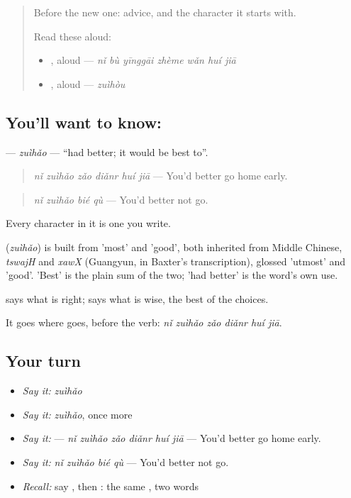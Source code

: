 \label{lesson:ZH-C282-zuihao}



\begin{quote}
Before the new one: advice, and the character it starts with.

Read these aloud:

\begin{itemize}
\raggedright
  \item {}, aloud — \emph{nǐ bù yīnggāi zhème wǎn huí jiā}
  \item {}, aloud — \emph{zuìhòu}
\end{itemize}
\end{quote}

\subsection*{You'll want to know: }
\textbf{} — \emph{zuìhǎo} — \textquotedblleft{}had better; it would be best to\textquotedblright{}.

\begin{quote}
\textbf{} \emph{nǐ zuìhǎo zǎo diǎnr huí jiā} — You'd better go home early.
\end{quote}

\begin{quote}
\emph{nǐ zuìhǎo bié qù} — You'd better not go.
\end{quote}

Every character in it is one you write.

\begin{cousinweb}
\textbf{} (\emph{zuìhǎo}) is built from  'most' and  'good', both inherited from Middle Chinese, \emph{tswajH} and \emph{xawX} (Guangyun, in Baxter's transcription), glossed 'utmost' and 'good'. 'Best' is the plain sum of the two; 'had better' is the word's own use.
\end{cousinweb}

\begin{grammarlens}[title={What you've built}]
 says what is right;  says what is wise, the best of the choices.

It goes where  goes, before the verb: \textbf{} \emph{nǐ zuìhǎo zǎo diǎnr huí jiā}.
\end{grammarlens}

\subsection*{Your turn}
\begin{itemize}
\raggedright
  \item \emph{Say it:} \emph{zuìhǎo}
  \item \emph{Say it:} \emph{zuìhǎo}, once more
  \item \emph{Say it:}  — \emph{nǐ zuìhǎo zǎo diǎnr huí jiā} — You'd better go home early.
  \item \emph{Say it:} \emph{nǐ zuìhǎo bié qù} — You'd better not go.
  \item \emph{Recall:} say , then : the same , two words
\end{itemize}

